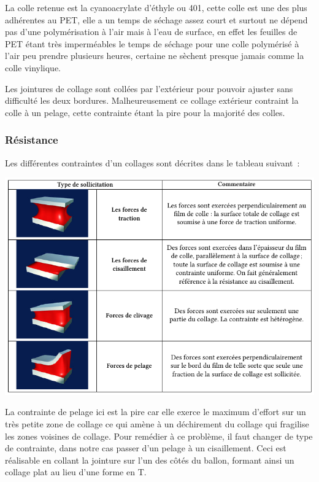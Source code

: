 \documentclass[a4paper,11pt]{article}
\begin{document}
La colle retenue est la cyanoacrylate d'éthyle ou 401, cette colle est une des plus adhérentes au PET, elle a un temps de séchage assez court et surtout ne dépend pas d'une polymérisation à l'air mais à l'eau de surface, en effet les feuilles de PET étant très imperméables le temps de séchage pour une colle polymérisé à l'air peu prendre plusieurs heures, certaine ne sèchent presque jamais comme la colle vinylique.

Les jointures de collage sont collées par l'extérieur pour pouvoir ajuster sans difficulté les deux bordures. Malheureusement ce collage extérieur contraint la colle à un pelage, cette contrainte étant la pire pour la majorité des colles.

\subsubsection{Résistance}

Les différentes contraintes d'un collages sont décrites dans le tableau suivant~:
\begin{center}
 \includegraphics[width=15cm]{../Images/colle_contraintes.png}
\end{center}

La contrainte de pelage ici est la pire car elle exerce le maximum d'effort sur un très petite zone de collage ce qui amène à un déchirement du collage qui fragilise les zones voisines de collage. Pour remédier à ce problème, il faut changer de type de contrainte, dans notre cas passer d'un pelage à un cisaillement. Ceci est réalisable en collant la jointure sur l'un des côtés du ballon, formant ainsi un collage plat au lieu d'une forme en T.
\end{document}
